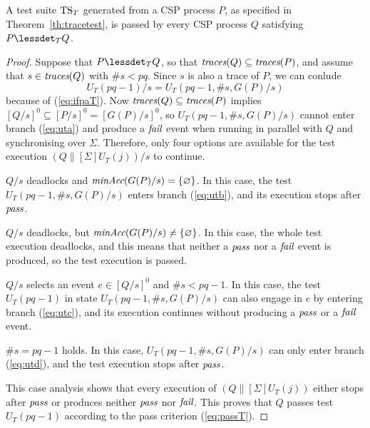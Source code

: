 \begin{lemma}\label{lemma:mainfsoundtrace}
A test suite ${\text{TS}}_T$ generated from a CSP process $P$, as specified in
Theorem~\ref{th:tracetest}, is passed by every CSP process $Q$ satisfying
$P\lessdet_T Q$.
\end{lemma}
\begin{proof}
Suppose that $P\lessdet_T Q$, so that $\text{\it traces}(Q)\subseteq\text{\it traces}(P)$, and assume that
$s\in\text{\it traces}(Q)$ with $\#s < pq$. Since $s$ is also a trace of $P$, we can conlude
$$U_T(pq-1)/s = U_T(pq-1,\#s,G(P)/s)$$ because of (\ref{eq:ifpaT}). Now $\text{\it traces}(Q)\subseteq\text{\it traces}(P)$
implies $[Q/s]^0\subseteq [P/s]^0 = [G(P)/s]^0$, so $U_T(pq-1,\#s,G(P)/s)$
cannot enter branch (\ref{eq:uta}) and produce a ${\text{\it fail}}$ event when running
in parallel with $Q$ and synchronising over $\Sigma$. Therefore, only four
options are available for the test execution    $(Q\parallel[\Sigma]
U_T(j))/s$ to continue.

\medskip
{} $Q/s$ deadlocks and $\text{\it minAcc}(G(P)/s) = \{
\varnothing \}$. In this case, the test $U_T(pq-1,\#s,G(P)/s)$ enters branch
(\ref{eq:utb}), and its execution stops after ${\text{\it pass}}$.

\medskip
{} $Q/s$ deadlocks, but
$\text{\it minAcc}(G(P)/s)\neq\{\varnothing\}$. In this case, the whole test execution
deadlocks, and this means that neither a ${\text{\it pass}}$ nor a ${\text{\it fail}}$ event is
produced, so the test execution is passed.

\medskip
{} $Q/s$ selects an event $e\in[Q/s]^0$ and $\#s <
pq-1$. In this case, the test $U_T(pq-1)$ in state $U_T(pq-1,\#s,G(P)/s)$ can
also engage in $e$ by entering branch (\ref{eq:utc}), and its execution
continues without producing a ${\text{\it pass}}$ or a ${\text{\it fail}}$ event.

\medskip
{} $\#s = pq-1$ holds. In this case,
$U_T(pq-1,\#s,G(P)/s)$ can only enter branch (\ref{eq:utd}), and the test
execution stops after ${\text{\it pass}}$.

This case analysis shows that every   execution of $(Q\parallel[\Sigma] U_T(j))$
either stops after ${\text{\it pass}}$ or produces neither ${\text{\it pass}}$ nor ${\text{\it fail}}$. This
proves that $Q$ passes test $U_T(pq-1)$ according to the pass  criterion (\ref{eq:passT}).
\xbox
\end{proof}

